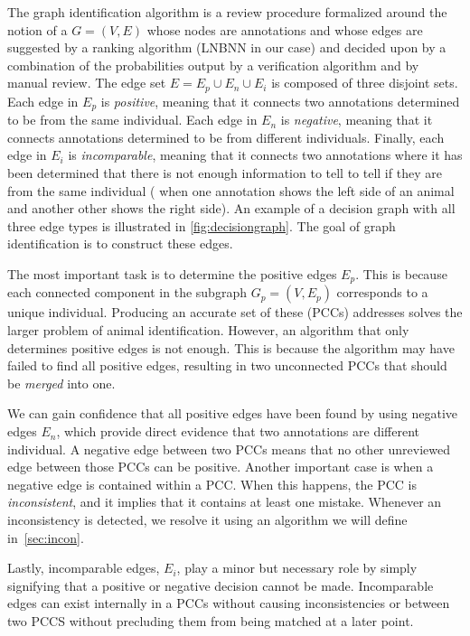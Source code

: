 \decisiongraph{}

The graph identification algorithm is a review procedure formalized around the notion of a  $G = (V, E)$ whose nodes are annotations and whose edges are suggested by a ranking algorithm (LNBNN in our
case) and decided upon by a combination of the probabilities output by a verification algorithm and by manual
review.  The edge set $E = E_p \cup E_n \cup E_i$ is composed of three disjoint sets. Each edge in $E_p$ is
\emph{positive}, meaning that it connects two annotations determined to be from the same individual. Each edge in
$E_n$ is \emph{negative}, meaning that it connects annotations determined to be from different individuals.
Finally, each edge in $E_i$ is \emph{incomparable}, meaning that it connects two annotations where it has been
determined that there is not enough information to tell to tell if they are from the same individual (\eg{} when
one annotation shows the left side of an animal and another other shows the right side).  An example of a decision
graph with all three edge types is illustrated in \cref{fig:decisiongraph}. The goal of graph identification is to
construct these edges.

The most important task is to determine the positive edges $E_p$.  This is because each connected component in the
subgraph $G_p = (V, E_p)$ corresponds to a unique individual.  Producing an accurate set of these
 (PCCs) addresses solves the larger problem of animal identification.
However, an algorithm that only determines positive edges is not enough.  This is because the algorithm may have
failed to find all positive edges, resulting in two unconnected PCCs that should be \emph{merged} into one.

We can gain confidence that all positive edges have been found by using negative edges $E_n$, which provide
  direct evidence that two annotations are different individual.
A negative edge between two PCCs means that no other unreviewed edge between those PCCs can be positive.
Another important case is when a negative edge is contained within a PCC.
When this happens, the PCC is \emph{inconsistent}, and it implies that it contains at least one mistake.
Whenever an inconsistency is detected, we resolve it using an algorithm we will define in~\cref{sec:incon}.

Lastly, incomparable edges, $E_i$, play a minor but necessary role by simply signifying that a positive or negative
decision cannot be made.  Incomparable edges can exist internally in a PCCs without causing inconsistencies or
between two PCCS without precluding them from being matched at a later point.

